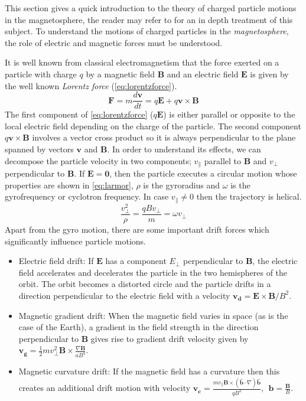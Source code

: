 This section gives a quick introduction to the theory of charged particle motions in the 
magnetosphere, the reader may refer to \citet{roederer2012dynamics} for an in depth treatment of 
this subject. To understand the motions of charged particles in the \emph{magnetosphere}, the role of electric and magnetic forces must be understood.

It is well known from classical electromagnetism that the force exerted on a particle with charge 
$q$ by a magnetic field $\mathbf{B}$ and an electric field $\mathbf{E}$ is given by the well known 
\emph{Lorentz force} (\cref{eq:lorentzforce}).
%
\begin{equation}\label{eq:lorentzforce}
    \mathbf{F} = m\frac{d\mathbf{v}}{dt} = q\mathbf{E} + q\mathbf{v} \times \mathbf{B}
\end{equation}
%
The first component of \cref{eq:lorentzforce} ($q\mathbf{E}$) is either parallel or opposite to the 
local electric field depending on the charge of the particle. The second component 
$q\mathbf{v} \times \mathbf{B}$ involves a vector cross product so it is always perpendicular to 
the plane spanned by vectors $\mathbf{v}$ and $\mathbf{B}$. In order to understand its effects, we 
can decompose the particle velocity in two components; $v_{\parallel}$ parallel to $\mathbf{B}$ and 
$v_{\perp}$ perpendicular to $\mathbf{B}$. If $\mathbf{E} = \mathbf{0}$, then the particle executes 
a circular motion whose properties are shown in \cref{eq:larmor}, $\rho$ is the gyroradius and 
$\omega$ is the gyrofrequency or cyclotron frequency. In case $v_{\parallel} \neq 0$ then the 
trajectory is helical.
%
\begin{equation}\label{eq:larmor}
    \frac{v^{2}_{\perp}}{\rho} = \frac{qBv_{\perp}}{m} = \omega v_{\perp}
\end{equation}
%
Apart from the gyro motion, there are some important drift forces which significantly influence 
particle motions.
%
\begin{itemize}
    \item Electric field drift: If $\mathbf{E}$ has a component $E_{\perp}$ perpendicular to 
    $\mathbf{B}$, the electric field accelerates and decelerates the particle in the two 
    hemispheres of the orbit. The orbit becomes a distorted circle and the particle drifts in a 
    direction perpendicular to the electric field with a velocity 
    $\mathbf{v_d} = \mathbf{E} \times \mathbf{B} / B^2$.

    \item Magnetic gradient drift: When the magnetic field varies in space (as is the case of the 
    Earth), a gradient in the field strength in the direction perpendicular to $\mathbf{B}$ gives 
    rise to gradient drift velocity given by 
    $\mathbf{v_g} = \frac{1}{2} m v^2_{\perp}\mathbf{B} \times \frac{\nabla \mathbf{B}}{aB^3}$.

    \item Magnetic curvature drift: If the magnetic field has a curvature then this creates an 
    additional drift motion with velocity 
    $\mathbf{v_c} = \frac{ m v_{\parallel} \mathbf{B} \times (\hat{\mathbf{b}} \cdot \nabla) 
    \hat{\mathbf{b}} }{qB^2}, \ \ \mathbf{b} = \frac{\mathbf{B}}{B}$.
\end{itemize}


